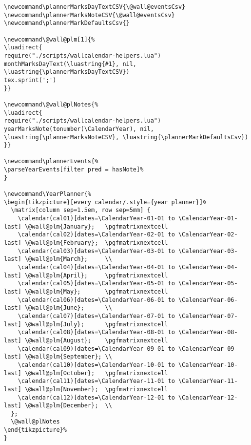 \documentclass[11pt,oneside]{memoir-article}
\begin{document}
\begin{verbatim}
\newcommand\plannerMarksDayTextCSV{\@wall@eventsCsv}
\newcommand\plannerMarksNoteCSV{\@wall@eventsCsv}
\newcommand\plannerMarkDefaultsCsv{}

\newcommand\@wall@plm[1]{%
\luadirect{
require("./scripts/wallcalendar-helpers.lua")
monthMarksDayText(\luastring{#1}, nil, \luastring{\plannerMarksDayTextCSV})
tex.sprint(';')
}}

\newcommand\@wall@plNotes{%
\luadirect{
require("./scripts/wallcalendar-helpers.lua")
yearMarksNote(tonumber(\CalendarYear), nil, \luastring{\plannerMarksNoteCSV}, \luastring{\plannerMarkDefaultsCsv})
}}

\newcommand\plannerEvents{%
\parseYearEvents[filter pred = hasNote]%
}

\newcommand\YearPlanner{%
\begin{tikzpicture}[every calendar/.style={year planner}]%
  \matrix[column sep=1.5em, row sep=5mm] {
    \calendar(cal01)[dates=\CalendarYear-01-01 to \CalendarYear-01-last] \@wall@plm{January};   \pgfmatrixnextcell
    \calendar(cal02)[dates=\CalendarYear-02-01 to \CalendarYear-02-last] \@wall@plm{February};  \pgfmatrixnextcell
    \calendar(cal03)[dates=\CalendarYear-03-01 to \CalendarYear-03-last] \@wall@plm{March};     \\
    \calendar(cal04)[dates=\CalendarYear-04-01 to \CalendarYear-04-last] \@wall@plm{April};     \pgfmatrixnextcell
    \calendar(cal05)[dates=\CalendarYear-05-01 to \CalendarYear-05-last] \@wall@plm{May};       \pgfmatrixnextcell
    \calendar(cal06)[dates=\CalendarYear-06-01 to \CalendarYear-06-last] \@wall@plm{June};      \\
    \calendar(cal07)[dates=\CalendarYear-07-01 to \CalendarYear-07-last] \@wall@plm{July};      \pgfmatrixnextcell
    \calendar(cal08)[dates=\CalendarYear-08-01 to \CalendarYear-08-last] \@wall@plm{August};    \pgfmatrixnextcell
    \calendar(cal09)[dates=\CalendarYear-09-01 to \CalendarYear-09-last] \@wall@plm{September}; \\
    \calendar(cal10)[dates=\CalendarYear-10-01 to \CalendarYear-10-last] \@wall@plm{October};   \pgfmatrixnextcell
    \calendar(cal11)[dates=\CalendarYear-11-01 to \CalendarYear-11-last] \@wall@plm{November};  \pgfmatrixnextcell
    \calendar(cal12)[dates=\CalendarYear-12-01 to \CalendarYear-12-last] \@wall@plm{December};  \\
  };
  \@wall@plNotes
\end{tikzpicture}%
}
\end{verbatim}
\end{document}
